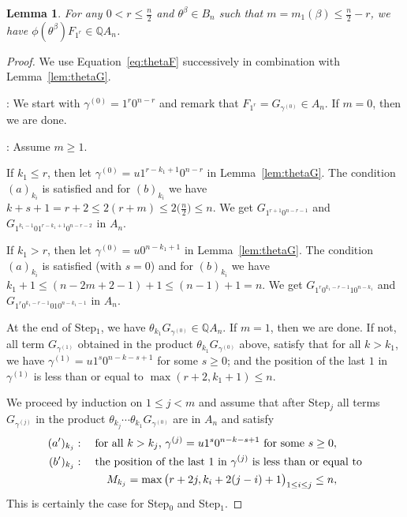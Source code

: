 \documentclass[11pt]{amsart}
\newtheorem{lemma}[theorem]{Lemma}
\theoremstyle{definition}
\numberwithin{equation}{section}
\begin{document}
\begin{lemma}\label{lem:full}
For any $0<r\le \frac{n}{2}$  and $\theta^\beta \in B_n$ such that $m=m_1(\beta)\le \frac{n}{2}-r$, we have $\phi(\theta^\beta) F_{1^r} \in  {\mathbb Q}A_n$.
\end{lemma}

\begin{proof} We use Equation~\eqref{eq:thetaF} successively in combination with Lemma~\ref{lem:thetaG}.

\medskip
{}:
We start with $\gamma^{(0)}=1^r0^{n-r}$ and remark that $F_{1^r}=G_{\gamma^{(0)}}\in A_n$. If $m=0$, then we are done.

\medskip
{}: Assume $m\ge 1$.

If $k_1\le r$, then let $\gamma^{(0)}=u1^{r-k_1+1}0^{n-r}$ in Lemma~\ref{lem:thetaG}. The condition $(a)_{k_i}$ is satisfied and for $(b)_{k_i}$ we have
$k+s+1=r+2\le 2(r+m)\le 2\big(\frac{n}{2}\big)\le n$. We get $G_{1^{r+1}0^{n-r-1}}$ and $G_{1^{k_1-1}01^{r-k_1+1}0^{n-r-2}}$ in $A_n$.

If $k_1>r$, then let $\gamma^{(0)}=u0^{n-k_1+1}$ in Lemma~\ref{lem:thetaG}.  The condition $(a)_{k_i}$ is satisfied (with $s=0$) and for $(b)_{k_i}$ we have
$k_1+1\le (n-2m+2-1)+1\le (n-1)+1=n$. We get $G_{1^{r}0^{k_1-r-1}10^{n-k_1}}$ and $G_{1^{r}0^{k_1-r-1}010^{n-k_1-1}}$ in $A_n$.


At the end of Step$_1$, we have $\theta_{k_1}G_{\gamma^{(0)}}\in {\mathbb Q}A_n$. If $m=1$, then we are done. If not, all term $G_{\gamma^{(1)}}$ obtained in the product $\theta_{k_1}G_{\gamma^{(0)}}$ above,  satisfy that  for all $k>k_1$, we have
$\gamma^{(1)} = u1^{s}0^{n-k-s+1}$ for some $s\ge 0$;
and the position of the last $1$ in $\gamma^{(1)}$ is  less than or equal to $\max(r+2,k_1+1)\le n$.

We proceed by induction on $1\le j<m$ and assume that after Step$_{j}$ all terms $G_{\gamma^{(j)}}$  in the product $\theta_{k_{j}}\cdots\theta_{k_1}G_{\gamma^{(0)}}$
are in $A_n$ and satisfy
 \begin{align*}
 	(a')_{k_{j}}&:\quad \text{for all $k>k_{j}$,\ } \gamma^{(j)} = u1^{s}0^{n-k-s+1}\text{ for some }s\ge 0,\\
	(b')_{k_{j}}&:\quad \text{the position of the last $1$ in $\gamma^{(j)}$ is  less than or equal to}\\
	&\hskip .4in M_{k_j}=\max\big(r+2j,k_i+2(j-i)+1\big)_{1\le i\le j}\le n,
 \end{align*}
This is certainly the case for Step$_0$ and Step$_1$.


\end{proof}
\end{document}
